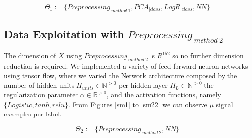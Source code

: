 \begin{equation}
\Theta_{1}:= \{ Preprocessing_{ \ method \ 1},PCA_{|class},LogR_{|class},NN \}
\label{eq:1}
\end{equation}


\subsection{Data Exploitation with $Preprocessing_{ \ method \ 2}$}
The dimension of $X$ using $Preprocessing_{ \ method \ 2}$ is $R^{152}$ so no further dimension reduction is required. We implemented a variety of feed forward neuron networks using tensor flow, where we varied the Network architecture composed by the number of hidden units $H_{units} \in \mathbb{N}^{>0}$ per hidden layer $H_{L} \in \mathbb{N}^{>0}$ the regularization parameter $\alpha \in \mathbb{R}^{>0}$, and the activation functions, namely $ \{  Logistic, tanh, relu \}$. From Figures \ref{sm1} to  \ref{sm22} we can observe $\mu$ signal examples per label.

\begin{equation}
\Theta_{2}:= \{ Preprocessing_{ \ method \ 2},NN \}
\label{eq:2}
\end{equation}


